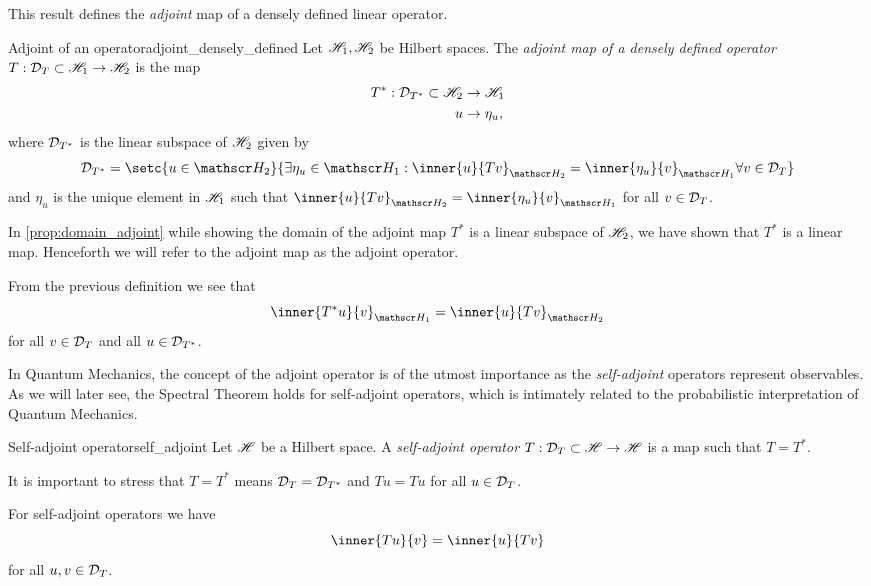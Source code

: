 This result defines the \emph{adjoint} map of a densely defined linear operator.
\begin{definition}{Adjoint of an operator}{adjoint_densely_defined}
    Let \(\mathscr{H}_1, \mathscr{H}_2\) be Hilbert spaces. The \emph{adjoint map of a densely defined operator \(T : \mathcal{D}_{T} \subset \mathscr{H}_1 \to \mathscr{H}_2\)} is the map
    \begin{align*}
        T^* : \mathcal{D}_{T^*} \subset \mathscr{H}_2 &\to \mathscr{H}_1\\
                                            u &\to \eta_u,
    \end{align*}
    where \(\mathcal{D}_{T^*}\) is the linear subspace of \(\mathscr{H}_2\) given by
    \begin{equation*}
        \domain{T^*} = \setc{u \in \hilbert_2}{\exists \eta_u \in \hilbert_1 : \inner{u}{Tv}_{\hilbert_2} = \inner{\eta_u}{v}_{\hilbert_1} \forall v \in \domain{T}}
    \end{equation*}
    and \(\eta_u\) is the unique element in \(\mathscr{H}_1\) such that \(\inner{u}{Tv}_{\hilbert_2} = \inner{\eta_u}{v}_{\hilbert_1}\) for all \(v \in \mathcal{D}_{T}\).
\end{definition}
\begin{remark}
    In \cref{prop:domain_adjoint} while showing the domain of the adjoint map \(T^*\) is a linear subspace of \(\mathscr{H}_2\), we have shown that \(T^*\) is a linear map. Henceforth we will refer to the adjoint map as the adjoint operator.
\end{remark}
\begin{remark}
    From the previous definition we see that
    \begin{equation*}
        \inner{T^*u}{v}_{\hilbert_1} = \inner{u}{Tv}_{\hilbert_2}
    \end{equation*}
    for all \(v \in \mathcal{D}_{T}\) and all \(u \in \mathcal{D}_{T^*}\).
\end{remark}

In Quantum Mechanics, the concept of the adjoint operator is of the utmost importance as the \emph{self-adjoint} operators represent observables. As we will later see, the Spectral Theorem holds for self-adjoint operators, which is intimately related to the probabilistic interpretation of Quantum Mechanics.
\begin{definition}{Self-adjoint operator}{self_adjoint}
    Let \(\mathscr{H}\) be a Hilbert space. A \emph{self-adjoint operator \(T : \mathcal{D}_{T} \subset \mathscr{H} \to \mathscr{H}\)} is a map such that \(T = T^*\).
\end{definition}
\begin{remark}
    It is important to stress that \(T = T^*\) means \(\mathcal{D}_{T} = \mathcal{D}_{T^*}\) and \(Tu = Tu\) for all \(u \in \mathcal{D}_{T}\).
\end{remark}
\begin{remark}
    For self-adjoint operators we have
    \begin{equation*}
        \inner{Tu}{v} = \inner{u}{Tv}
    \end{equation*}
    for all \(u, v\in \mathcal{D}_{T}\).
\end{remark}

